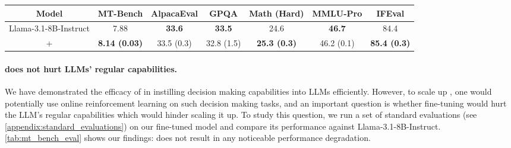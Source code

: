 \begin{table*}
    \centering
        \caption{\footnotesize \textbf{(Evaluation of \ours{} on standard tasks)} Evaluation of \ours{} vs Llama-3.1-8B-Instruct on standard benchmarks (numbers in parenthesis represent standard error over 3 seeds). \ours{} does not result in significant model degradation.}
        \vspace{0.2cm}
        \begin{tabular}{c|cccccc}
            \toprule
            Model & MT-Bench & AlpacaEval & GPQA & Math (Hard) & MMLU-Pro & IFEval \\
            \midrule
             Llama-3.1-8B-Instruct & 7.88 & \textbf{33.6} & \textbf{33.5} & 24.6 & \textbf{46.7} & 84.4\\
             + \ours{} & \textbf{8.14 (0.03)} & 33.5 (0.3) & 32.8 (1.5) & \textbf{25.3 (0.3)} & 46.2 (0.1) & \textbf{85.4 (0.3)} \\
             \bottomrule
        \end{tabular}
    \vspace{-0.2cm}
    \label{tab:mt_bench_eval}
\end{table*}

\paragraph{\ours{} does not hurt LLMs' regular capabilities.} We have demonstrated the efficacy of \ours{} in instilling decision making capabilities into LLMs efficiently. However, to scale up \ours{}, one would potentially use online reinforcement learning on such decision making tasks, and an important question is whether \ours{} fine-tuning would hurt the LLM's regular capabilities which would hinder scaling it up. To study this question, we run a set of standard evaluations (see \cref{appendix:standard_evaluations}) on our \ours{} fine-tuned model and compare its performance against Llama-3.1-8B-Instruct. \cref{tab:mt_bench_eval} shows our findings: \ours{} does not result in any noticeable performance degradation.
